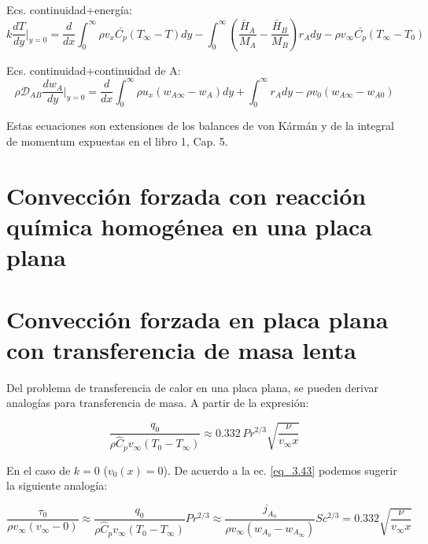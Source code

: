 Ecs. continuidad+energía:
\begin{equation}
    k \frac{dT}{dy} \bigg|_{y=0} = \frac{d}{dx} \int_{0}^{\infty} \rho v_x \bar{C_p} (T_{\infty} - T) dy
    - \int_{0}^{\infty} \left( \frac{\bar{H}_A}{M_A} - \frac{\bar{H}_B}{M_B} \right) r_A dy
    - \rho v_{\infty} \bar{C_p} (T_{\infty} - T_0) 
    \label{3.6}
\end{equation}

Ecs. continuidad+continuidad de A:
\begin{equation}
    \rho \mathscr {D}_{AB} \frac{dw_A}{dy} \bigg|_{y=0} = \frac{d}{dx} \int_{0}^{\infty} \rho u_x (w_{A\infty} - w_A) dy
    + \int_{0}^{\infty} r_A dy - \rho v_{0} (w_{A\infty} - w_{A0})
    \label{3.7}
\end{equation}

Estas ecuaciones son extensiones de los balances de von Kármán y de la integral de momentum expuestas en el libro 1, Cap. 5.

\section{Convección forzada con reacción química homogénea en una placa plana}

\section{Convección forzada en placa plana con transferencia de masa lenta}
 Del problema de transferencia de calor en una placa plana, se pueden derivar analogías para transferencia de masa. A partir de la expresión:

\begin{equation}
\frac{q_0}{\rho \hat{C}_p v_\infty (T_0 - T_\infty)} \approx 0.332 \, Pr^{2/3} \sqrt{\frac{\nu}{v_\infty x}}	\tag{3.45}
        \label{eq_3.45}
\end{equation}

En el caso de $k = 0$ ($v_0 (x) = 0$). De acuerdo a la ec. \ref{eq_3.43} podemos sugerir la siguiente analogía:

\begin{equation}
\frac{\tau_0}{\rho v_\infty ( v_\infty-0)} \approx \frac{q_0}{\rho \hat{C}_p v_\infty(T_0 - T_\infty)} Pr^{2/3} \approx \frac{j_{A_0}}{\rho v_\infty(w_{A_0}-w_{A_\infty})}Sc^{2/3}=  0.332 \sqrt{\frac{\nu}{v_\infty x}}
	\tag{3.46}
        \label{eq_3.46}
        
\end{equation}
